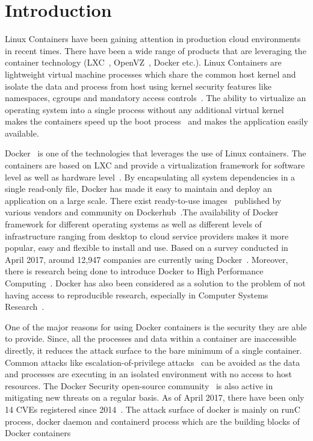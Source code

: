 \section{Introduction}

Linux Containers have been gaining attention in production cloud environments in recent times. There have been a wide range of products that are leveraging the container technology (LXC~\cite{lxc1}, OpenVZ~\cite{openvz}, Docker\cite{dockerarticle} etc.). Linux Containers are lightweight virtual machine processes which share the common host kernel and isolate the data and process from host using kernel security features like namespaces, cgroups and mandatory access controls~\cite{hardenlinuxcontainer}. The ability to virtualize an operating system into a single process without any additional virtual kernel makes the containers speed up the boot process~\cite{containerperformance} and makes the application easily available.

Docker~\cite{docker} is one of the technologies that leverages the use of Linux containers. The containers are based on LXC\cite{lxc1} and provide a virtualization framework for software level as well as hardware level~\cite{dockersaas}. By encapsulating all system dependencies in a single read-only file, Docker has made it easy to maintain and deploy an application on a large scale. There exist ready-to-use images~\cite{dockerimages} published by various vendors and community on Dockerhub~\cite{dockerhub}.The availability of Docker framework for different operating systems as well as different levels of infrastructure ranging from desktop to cloud service providers makes it more popular, easy and flexible to install and use. Based on a survey conducted in April 2017, around 12,947 companies are currently using Docker~\cite{survey1}. Moreover, there is research being done to introduce Docker to High Performance Computing~\cite{dockerHPC}. Docker has also been considered as a solution to the problem of not having access to reproducible research, especially in Computer Systems Research~\cite{collberg2014,dockerrepresearch2014}.

One of the major reasons for using Docker containers is the security they are able to provide. Since, all the processes and data within a container are inaccessible directly, it reduces the attack surface to the bare minimum of a single container. Common attacks like escalation-of-privilege attacks~\cite{jessehertz2016} can be avoided as the data and processes are executing in an isolated environment with no access to host resources. The Docker Security open-source community~\cite{dockeropensource} is also active in mitigating new threats on a regular basis. As of April 2017, there have been only 14 CVEs registered since 2014~\cite{cvelist}. The attack surface of docker is mainly on runC process, docker daemon and containerd process which are the building blocks of Docker containers 

